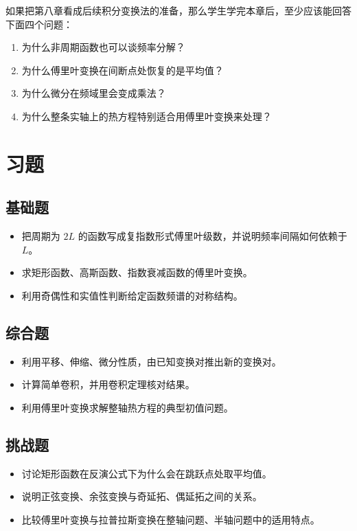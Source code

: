 \begin{sikao}{}{}
如果把第八章看成后续积分变换法的准备，那么学生学完本章后，至少应该能回答下面四个问题：
\begin{enumerate}
    \item 为什么非周期函数也可以谈频率分解？
    \item 为什么傅里叶变换在间断点处恢复的是平均值？
    \item 为什么微分在频域里会变成乘法？
    \item 为什么整条实轴上的热方程特别适合用傅里叶变换来处理？
\end{enumerate}
\end{sikao}

\section{习题}

\subsection*{基础题}
\begin{itemize}
    \item 把周期为 $2L$ 的函数写成复指数形式傅里叶级数，并说明频率间隔如何依赖于 $L$。
    \item 求矩形函数、高斯函数、指数衰减函数的傅里叶变换。
    \item 利用奇偶性和实值性判断给定函数频谱的对称结构。
\end{itemize}

\subsection*{综合题}
\begin{itemize}
    \item 利用平移、伸缩、微分性质，由已知变换对推出新的变换对。
    \item 计算简单卷积，并用卷积定理核对结果。
    \item 利用傅里叶变换求解整轴热方程的典型初值问题。
\end{itemize}

\subsection*{挑战题}
\begin{itemize}
    \item 讨论矩形函数在反演公式下为什么会在跳跃点处取平均值。
    \item 说明正弦变换、余弦变换与奇延拓、偶延拓之间的关系。
    \item 比较傅里叶变换与拉普拉斯变换在整轴问题、半轴问题中的适用特点。
\end{itemize}
